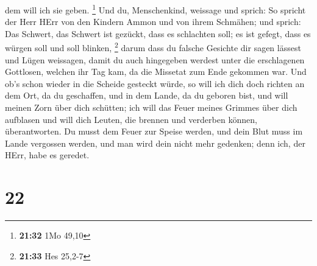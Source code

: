 dem will ich sie geben. \footnote{\textbf{21:32} 1Mo 49,10}
 Und du, Menschenkind, weissage und sprich: So spricht
der Herr HErr von den Kindern Ammon und von ihrem Schmähen; und sprich:
Das Schwert, das Schwert ist gezückt, dass es schlachten soll; es ist
gefegt, dass es würgen soll und soll blinken, \footnote{\textbf{21:33}
  Hes 25,2-7}  darum dass du falsche Gesichte dir sagen
lässest und Lügen weissagen, damit du auch hingegeben werdest unter die
erschlagenen Gottlosen, welchen ihr Tag kam, da die Missetat zum Ende
gekommen war.  Und ob's schon wieder in die Scheide
gesteckt würde, so will ich dich doch richten an dem Ort, da du
geschaffen, und in dem Lande, da du geboren bist,  und
will meinen Zorn über dich schütten; ich will das Feuer meines Grimmes
über dich aufblasen und will dich Leuten, die brennen und verderben
können, überantworten.  Du musst dem Feuer zur Speise
werden, und dein Blut muss im Lande vergossen werden, und man wird dein
nicht mehr gedenken; denn ich, der HErr, habe es geredet.

\hypertarget{section-21}{%
\section{22}\label{section-21}}

